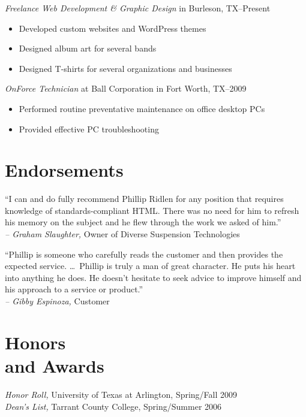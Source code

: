 \documentclass[margin]{res}
\begin{document}
\begin{resume}
                {\sl Freelance Web Development \textrm{\&} Graphic Design}
                in Burleson, TX--Present
                \begin{itemize} \itemsep -2pt %
                  \item Developed custom websites and WordPress themes
                  \item Designed album art for several bands
                  \item Designed T-shirts for several organizations and businesses
                \end{itemize}
                
                {\sl OnForce Technician}
                at Ball Corporation in Fort Worth, TX--2009
                \begin{itemize} \itemsep -2pt %
                  \item Performed routine preventative maintenance on office desktop PCs
                  \item Provided effective PC troubleshooting
                \end{itemize}

      
\section{\textsf{Endorsements}}
                
                ``I can and do fully recommend Phillip Ridlen for any position that requires 
                knowledge of standards-compliant HTML. There was no need for him to refresh his 
                memory on the subject and he flew through the work we asked of him.'' \\
                {\sl -- Graham Slaughter,} Owner of Diverse Suspension Technologies

                ``Phillip is someone who carefully reads the customer and then 
                provides the expected service. \ldots\ Phillip is truly a man of great character. 
                He puts his heart into anything he does. He doesn't hesitate to seek advice 
                to improve himself and his approach to a service or product.'' \\
                {\sl -- Gibby Espinoza,} Customer


\section{\textsf{Honors \\and Awards}}
                
                {\sl Honor Roll,} University of Texas at Arlington, Spring/Fall 2009 \\
                {\sl Dean's List,} Tarrant County College, Spring/Summer 2006
                
                
\end{resume}
\end{document}
